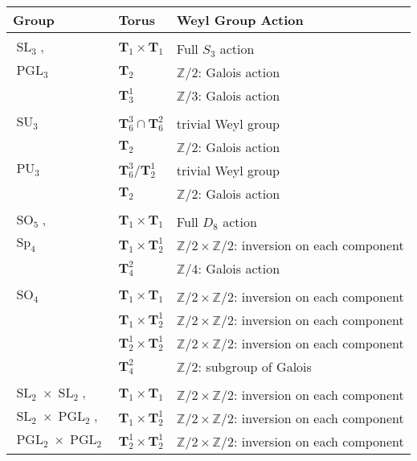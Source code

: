 \documentclass[11pt]{amsart}
\theoremstyle{plain}
\theoremstyle{definition}
\DeclareMathOperator{\PGL}{PGL}
\DeclareMathOperator{\SL}{SL}
\DeclareMathOperator{\SU}{SU}
\DeclareMathOperator{\PU}{PU}
\DeclareMathOperator{\SO}{SO}
\DeclareMathOperator{\Sp}{Sp}
\newcommand{\ZZ}{\mathbb{Z}}
\newcommand{\T}{\mathbf{T}}
\begin{document}
\begin{tabular}{l|l|l}
Group & Torus & Weyl Group Action \\
\hline && \\
$\SL_3,$ & $\T_1 \times \T_1$ & Full $S_3$ action \\
$\PGL_3$ & $\T_2$ & $\ZZ/2$: Galois action \\
& $\T_3^1$ & $\ZZ/3$: Galois action \\
\hline && \\
$\SU_3$ & $\T_6^3 \cap \T_6^2$ & trivial Weyl group \\
& $\T_2$ & $\ZZ/2$: Galois action \\
$\PU_3$ & $\T_6^3 / \T_2^1$ & trivial Weyl group \\
& $\T_2$ & $\ZZ/2$: Galois action \\
\hline && \\
$\SO_5,$ & $\T_1 \times \T_1$ & Full $D_8$ action \\
$\Sp_4$ & $\T_1 \times \T_2^1$ & $\ZZ/2 \times \ZZ/2$: inversion on each component \\
& $\T_4^2$ & $\ZZ/4$: Galois action \\
\hline && \\
$\SO_4$ & $\T_1 \times \T_1$ & $\ZZ / 2 \times \ZZ / 2$: inversion on each component \\
& $\T_1 \times \T_2^1$ & $\ZZ / 2 \times \ZZ / 2$: inversion on each component \\
& $\T_2^1 \times \T_2^1$ & $\ZZ / 2 \times \ZZ / 2$: inversion on each component \\
& $\T_4^2$ & $\ZZ / 2$: subgroup of Galois \\
\hline && \\
$\SL_2 \times \SL_2,$ & $\T_1 \times \T_1$ & $\ZZ / 2 \times \ZZ / 2$: inversion on each component \\
$\SL_2 \times \PGL_2,$ & $\T_1 \times \T_2^1$ & $\ZZ / 2 \times \ZZ / 2$: inversion on each component \\
$\PGL_2 \times \PGL_2$ & $\T_2^1 \times \T_2^1$& $\ZZ / 2 \times \ZZ / 2$: inversion on each component
\end{tabular}
\end{document}
